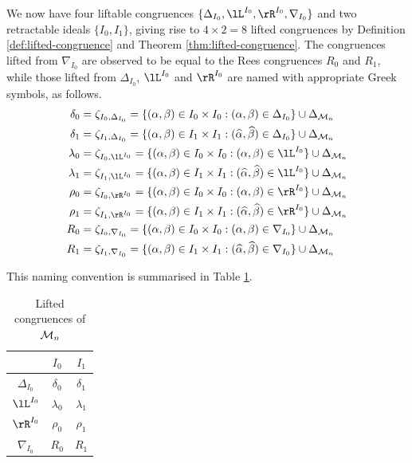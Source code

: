 We now have four liftable congruences $\{\Delta_{I_0}, \lL^{I_0}, \rR^{I_0}, \nabla_{I_0}\}$ and
two retractable ideals $\{I_0, I_1\}$, giving rise to $4 \times 2 = 8$ lifted
congruences by Definition \ref{def:lifted-congruence} and Theorem
\ref{thm:lifted-congruence}.  The congruences lifted from $\nabla_{I_0}$ are
observed to be equal to the Rees congruences $R_0$ and $R_1$, while those lifted
from $\Delta_{I_0}$, $\lL^{I_0}$ and $\rR^{I_0}$ are named with appropriate Greek symbols,
as follows.
\begin{align*}
  \delta_0 &= \zeta_{I_0,\Delta_{I_0}}
  = \{(\alpha,\beta) \in I_0 \times I_0 :
    (\alpha, \beta) \in \Delta_{I_0}\} \cup \Delta_{\Mot_n} \\
  \delta_1 &= \zeta_{I_1,\Delta_{I_0}}
  = \{(\alpha,\beta) \in I_1 \times I_1 :
    (\widehat\alpha, \widehat\beta) \in \Delta_{I_0}\} \cup \Delta_{\Mot_n} \\
  \lambda_0 &=\zeta_{I_0,\lL^{I_0}}
  = \{(\alpha,\beta) \in I_0 \times I_0 :
    (\alpha, \beta) \in \lL^{I_0}\} \cup \Delta_{\Mot_n} \\
  \lambda_1 &= \zeta_{I_1,\lL^{I_0}}
  = \{(\alpha,\beta) \in I_1 \times I_1 :
    (\widehat\alpha, \widehat\beta) \in \lL^{I_0}\} \cup \Delta_{\Mot_n} \\
  \rho_0 &= \zeta_{I_0,\rR^{I_0}}
  = \{(\alpha,\beta) \in I_0 \times I_0 :
    (\alpha, \beta) \in \rR^{I_0}\} \cup \Delta_{\Mot_n} \\
  \rho_1 &= \zeta_{I_1,\rR^{I_0}}
  = \{(\alpha,\beta) \in I_1 \times I_1 :
    (\widehat\alpha, \widehat\beta) \in \rR^{I_0}\} \cup \Delta_{\Mot_n} \\
  R_0 &= \zeta_{I_0,\nabla_{I_0}}
  = \{(\alpha,\beta) \in I_0 \times I_0 :
    (\alpha, \beta) \in \nabla_{I_0}\} \cup \Delta_{\Mot_n} \\
  R_1 &= \zeta_{I_1,\nabla_{I_0}}
  = \{(\alpha,\beta) \in I_1 \times I_1 :
    (\widehat\alpha, \widehat\beta) \in \nabla_{I_0}\} \cup \Delta_{\Mot_n}
\end{align*}

This naming convention is summarised in Table \ref{tab:mn-lifted-congruences}.

\begin{table}[h]
  \centering
  \renewcommand\arraystretch{1.0}
  \begin{tabular}[h]{| c | c | c |}
    \cline{2-3}
    \mc1{c|}{} & $I_0$ & $I_1$ \\ \hline
    $\Delta_{I_0}$ & $\delta_0$ & $\delta_1$ \\ \hline
    $\lL^{I_0}$ & $\lambda_0$ & $\lambda_1$ \\ \hline
    $\rR^{I_0}$ & $\rho_0$ & $\rho_1$ \\ \hline
    $\nabla_{I_0}$ & $R_0$ & $R_1$ \\ \hline
  \end{tabular}
  \caption{Lifted congruences of $\mathcal{M}_n$}
  \label{tab:mn-lifted-congruences}
\end{table}


